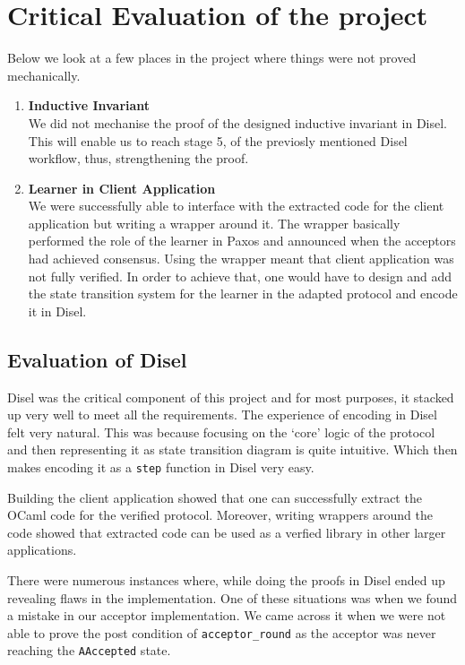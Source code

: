 \section{Critical Evaluation of the project}
Below we look at a few places in the project where things were not proved
mechanically.
\begin{enumerate}
  \item \textbf{Inductive Invariant} \\
    We did not mechanise the proof of the designed inductive invariant in Disel.
    This will enable us to reach stage 5, of the previosly mentioned Disel workflow,
    thus, strengthening the proof.
  \item \textbf{Learner in Client Application} \\
    We were successfully able to interface with the extracted code for the client
    application but writing a wrapper around it. The wrapper basically performed
    the role of the learner in Paxos and announced when the acceptors had
    achieved consensus. Using the wrapper meant that client application was not
    fully verified. In order to achieve that, one would have to design and add the
    state transition system for the learner in the adapted protocol and encode it
    in Disel.

\end{enumerate}

\subsection{Evaluation of Disel}
Disel was the critical component of this project and for most purposes, it
stacked up very well to meet all the requirements.
The experience of encoding in Disel felt very natural. This was because
focusing on the `core' logic of the protocol and then representing it
as state transition diagram is quite intuitive. Which then makes
encoding it as a \texttt{step} function in Disel very easy.

Building the client application showed that one can successfully extract
the OCaml code for the verified protocol. Moreover, writing wrappers
around the code showed that extracted code can be used as a verfied library
in other larger applications.

There were numerous instances where, while doing the proofs in Disel
ended up revealing flaws in the implementation. One of these situations was
when we found a mistake in our acceptor implementation. We came
across it when we were not able to prove the post condition of \texttt{acceptor\_round}
as the acceptor was never reaching the \texttt{AAccepted} state.

